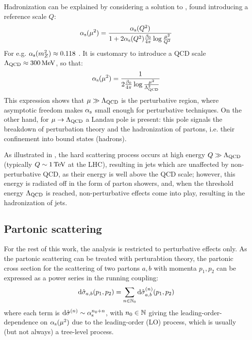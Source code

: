 Hadronization can be explained by considering a solution to , found introducing a reference scale $ Q $:
\begin{equation}
  \alpha_\text{s}(\mu^2) = \frac{\alpha_\text{s}(Q^2)}{1 + 2 \alpha_\text{s}(Q^2) \frac{\beta_0}{4\pi} \log \frac{\mu^2}{Q^2}}
\end{equation}
For e.g. $ \alpha_\text{s}(m_Z^2) \approx 0.118 $ \cite{PDG-2024}. It is customary to introduce a QCD scale $ \Lambda_\text{QCD} \approx 300 \,\mathrm{MeV} $, so that:
\begin{equation}
  \alpha_\text{s}(\mu^2) = \frac{1}{2\frac{\beta_0}{4\pi} \log \frac{\mu^2}{\Lambda_\text{QCD}^2}}
\end{equation}
This expression shows that $ \mu \gg \Lambda_\text{QCD} $ is the perturbative region, where asymptotic freedom makes $ \alpha_\text{s} $ small enough for perturbative techniques. On the other hand, for $ \mu \rightarrow \Lambda_\text{QCD} $ a Landau pole is present: this pole signals the breakdown of perturbation theory and the hadronization of partons, i.e. their confinement into bound states (hadrons).

As illustrated in , the hard scattering process occurs at high energy $ Q \gg \Lambda_\text{QCD} $ (typically $ Q \sim 1\,\mathrm{TeV} $ at the LHC), resulting in jets which are unaffected by non-perturbative QCD, as their energy is well above the QCD scale; however, this energy is radiated off in the form of parton showers, and, when the threshold energy $ \Lambda_\text{QCD} $ is reached, non-perturbative effects come into play, resulting in the hadronization of jets.

\subsection{Partonic scattering}

For the rest of this work, the analysis is restricted to perturbative effects only. As the partonic scattering can be treated with perturabtion theory, the partonic cross section for the scattering of two partons $ a , b $ with momenta $ p_1 , p_2 $ can be expressed as a power series in the running coupling:
\begin{equation}
  \mathrm{d}\hat{\sigma}_{a,b}(p_1 , p_2) = \sum_{n \in \mathbb{N}_0} \mathrm{d}\hat{\sigma}_{a,b}^{(n)}(p_1 , p_2)
\end{equation}
where each term is $ \mathrm{d}\hat{\sigma}^{(n)} \sim \alpha_\text{s}^{n_0 + n} $, with $ n_0 \in \mathbb{N} $ giving the leading-order-dependence on $ \alpha_\text{s}(\mu^2) $ due to the leading-order (LO) process, which is usually (but not always) a tree-level process.


